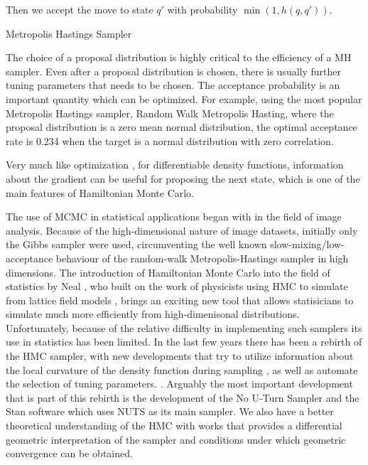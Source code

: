\documentclass[12pt]{report}
\begin{document}
Then we accept the move to state $q'$ with probability $ \min (1, h(q,q')) $.

\begin{algorithm}
\caption{Metropolis Hastings Sampler}


 
 
\end{algorithm}


The choice of a proposal distribution is highly critical to the efficiency of a MH sampler. Even after a proposal distribution is chosen, there is usually further tuning parameters that needs to be chosen. The acceptance probability is an important quantity which 
can be optimized. For example, using the most popular Metropolis Hastings sampler, Random Walk Metropolis Hasting, where the proposal distribution is a zero mean normal distribution,
the optimal acceptance rate is 0.234 when the target is a normal distribution with zero correlation.\cite{roberts1997weak,gelman1996efficient,roberts2001optimal} 

Very much like optimization \cite{wright1999numerical}, for differentiable density
functions, information about the gradient can be useful for proposing the next
state, which is one of the main features of Hamiltonian Monte Carlo.


The use of MCMC in statistical applications began with \cite{geman1984stochastic,besag1986statistical} in the field of image analysis. Because of the high-dimensional nature of image datasets, initially only the Gibbs sampler were used, circumventing the well known slow-mixing/low-acceptance behaviour of the random-walk Metropolis-Hastings sampler in high dimensions. The introduction of Hamiltonian Monte Carlo into the field of statistics by Neal \cite{neal2011mcmc,neal2012bayesian}, who built on the work of physicists using HMC to simulate from lattice field models \cite{duane1987hybrid}, brings an exciting new tool that allows statisicians to simulate much more efficiently from high-dimenisonal distributions. Unfortunately, because of the relative difficulty in implementing such samplers its use in statistics has been limited. In the last few years there has been a rebirth of the HMC sampler, with new developments that try to utilize information about the local curvature of the density function during  sampling \cite{girolami2011riemann,betancourt2013general}, as well as  automate the selection of tuning parameters.  \cite{hoffman2014no,betancourt2016identifying}. 
Arguably the most important development that is part of this rebirth is the development of the No U-Turn Sampler and the Stan software which uses NUTS as its main sampler. We also have a better theoretical understanding of the HMC with works \cite{betancourt2014geometric,livingstone2016geometric}
that provides a differential geometric interpretation of the sampler and conditions under which geometric convergence can be obtained.
\end{document}
